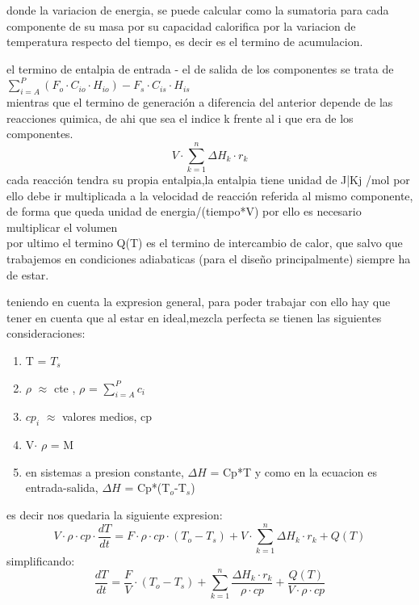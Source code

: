 \documentclass{report}
\begin{document}
\begin{flushleft}
	\noindent donde la variacion de energia, se puede calcular como la sumatoria para cada componente de su masa por su capacidad calorifica por la variacion de temperatura respecto del tiempo, es decir es el termino de acumulacion.

\vspace{1\baselineskip}
el termino de entalpia de entrada - el de salida de los componentes se trata de $ \sum_{i=A}^{P} (F_o \cdot C_{io} \cdot H_{io}) - F_s \cdot C_{is} \cdot H_{is}$\\
\vspace{1\baselineskip}
mientras que el termino de generación a diferencia del anterior depende de las reacciones quimica, de ahi que sea el indice k frente al i que era de los componentes.
\begin{equation*}
	V \cdot \sum_{k=1}^{n} \Delta H_k \cdot r_k
\end{equation*}
cada reacción tendra su propia entalpia,la entalpia tiene unidad de J|Kj /mol por ello debe ir multiplicada a la velocidad de reacción referida al mismo componente, de forma que queda unidad de energia/(tiempo*V) por ello es necesario multiplicar el volumen \\
\vspace{1\baselineskip}
por ultimo el termino Q(T) es el termino de intercambio de calor, que salvo que trabajemos en condiciones adiabaticas (para el diseño principalmente) siempre ha de estar.

teniendo en cuenta la expresion general, para poder trabajar con ello hay que tener en cuenta que al estar en ideal,mezcla perfecta se tienen las siguientes consideraciones:
\end{flushleft}
\begin{enumerate}[label=\bfseries\tiny\protect\circled{\small\arabic*}]
\item \label{n:1} T = $T_s$
\item \label{n:2} $\rho$ $\approx$ cte ,\hspace{0.1cm} $\rho$ = $\sum_{i=A}^{P} c_i$
\item \label{n:3} $cp_i$ $\approx$ valores medios, cp
\item \label{n:4} V$\cdot$ $\rho$ = M
\item \label{n:5} en sistemas a presion constante, $\Delta H$ = Cp*T y como en la ecuacion es entrada-salida, $\Delta H$ = Cp*(T$_o$-T$_s$)
\end{enumerate}
es decir nos quedaria la siguiente expresion:
\begin{equation}
	V \cdot \rho \cdot cp \cdot \frac{dT}{dt} = F \cdot  \rho \cdot cp \cdot (T_o - T_s) + V \cdot \sum_{k=1}^{n} \Delta H_k \cdot r_k + Q(T)
\end{equation}
simplificando:
\begin{equation}
	\frac{dT}{dt} = \frac{F}{V} \cdot (T_o - T_s) +  \sum_{k=1}^{n} \frac{\Delta H_k \cdot r_k}{\rho \cdot cp} + \frac{Q(T)}{V \cdot \rho \cdot cp}
\end{equation}
\newpage
\end{document}
